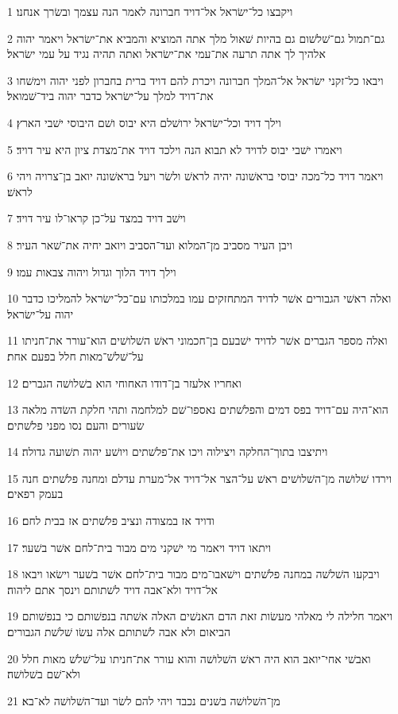 \par 1 ויקבצו כל־ישׂראל אל־דויד חברונה לאמר הנה עצמך ובשׂרך אנחנו׃
\par 2 גם־תמול גם־שׁלשׁום גם בהיות שׁאול מלך אתה המוציא והמביא את־ישׂראל ויאמר יהוה אלהיך לך אתה תרעה את־עמי את־ישׂראל ואתה תהיה נגיד על עמי ישׂראל׃
\par 3 ויבאו כל־זקני ישׂראל אל־המלך חברונה ויכרת להם דויד ברית בחברון לפני יהוה וימשׁחו את־דויד למלך על־ישׂראל כדבר יהוה ביד־שׁמואל׃
\par 4 וילך דויד וכל־ישׂראל ירושׁלם היא יבוס ושׁם היבוסי ישׁבי הארץ׃
\par 5 ויאמרו ישׁבי יבוס לדויד לא תבוא הנה וילכד דויד את־מצדת ציון היא עיר דויד׃
\par 6 ויאמר דויד כל־מכה יבוסי בראשׁונה יהיה לראשׁ ולשׂר ויעל בראשׁונה יואב בן־צרויה ויהי לראשׁ׃
\par 7 וישׁב דויד במצד על־כן קראו־לו עיר דויד׃
\par 8 ויבן העיר מסביב מן־המלוא ועד־הסביב ויואב יחיה את־שׁאר העיר׃
\par 9 וילך דויד הלוך וגדול ויהוה צבאות עמו׃
\par 10 ואלה ראשׁי הגבורים אשׁר לדויד המתחזקים עמו במלכותו עם־כל־ישׂראל להמליכו כדבר יהוה על־ישׂראל׃
\par 11 ואלה מספר הגברים אשׁר לדויד ישׁבעם בן־חכמוני ראשׁ השׁלושׁים הוא־עורר את־חניתו על־שׁלשׁ־מאות חלל בפעם אחת׃
\par 12 ואחריו אלעזר בן־דודו האחוחי הוא בשׁלושׁה הגברים׃
\par 13 הוא־היה עם־דויד בפס דמים והפלשׁתים נאספו־שׁם למלחמה ותהי חלקת השׂדה מלאה שׂעורים והעם נסו מפני פלשׁתים׃
\par 14 ויתיצבו בתוך־החלקה ויצילוה ויכו את־פלשׁתים ויושׁע יהוה תשׁועה גדולה׃
\par 15 וירדו שׁלושׁה מן־השׁלושׁים ראשׁ על־הצר אל־דויד אל־מערת עדלם ומחנה פלשׁתים חנה בעמק רפאים׃
\par 16 ודויד אז במצודה ונציב פלשׁתים אז בבית לחם׃
\par 17 ויתאו דויד ויאמר מי ישׁקני מים מבור בית־לחם אשׁר בשׁער׃
\par 18 ויבקעו השׁלשׁה במחנה פלשׁתים וישׁאבו־מים מבור בית־לחם אשׁר בשׁער וישׂאו ויבאו אל־דויד ולא־אבה דויד לשׁתותם וינסך אתם ליהוה׃
\par 19 ויאמר חלילה לי מאלהי מעשׂות זאת הדם האנשׁים האלה אשׁתה בנפשׁותם כי בנפשׁותם הביאום ולא אבה לשׁתותם אלה עשׂו שׁלשׁת הגבורים׃
\par 20 ואבשׁי אחי־יואב הוא היה ראשׁ השׁלושׁה והוא עורר את־חניתו על־שׁלשׁ מאות חלל ולא־שׁם בשׁלושׁה׃
\par 21 מן־השׁלושׁה בשׁנים נכבד ויהי להם לשׂר ועד־השׁלושׁה לא־בא׃

